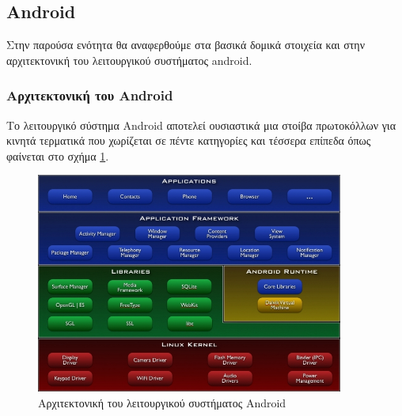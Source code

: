 	
	\subsection{Android}
	Στην παρούσα ενότητα θα αναφερθούμε στα βασικά δομικά στοιχεία και στην αρχιτεκτονική του λειτουργικού συστήματος android.
	
		\subsubsection{Αρχιτεκτονική του Android}
		Το λειτουργικό σύστημα Android αποτελεί ουσιαστικά μια στοίβα πρωτοκόλλων για κινητά τερματικά που χωρίζεται σε πέντε κατηγορίες και τέσσερα επίπεδα όπως φαίνεται στο σχήμα \ref{fig:android_system_architecture}.
		
		\begin{figure}[h]
			\centering
			\includegraphics[width=0.9\textwidth]{android_system_architecture.jpg}
			\caption{Αρχιτεκτονική του λειτουργικού συστήματος Android}
			\label{fig:android_system_architecture}
		\end{figure}
		
